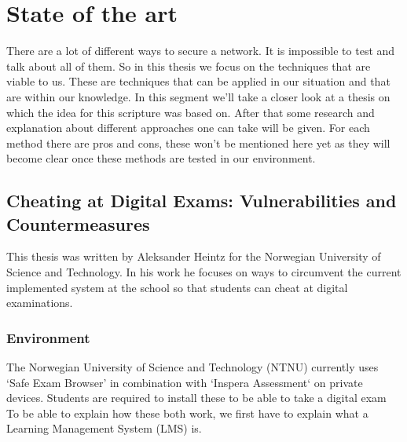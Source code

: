 \chapter{State of the art}
\label{ch:stand-van-zaken}



There are a lot of different ways to secure a network. It is impossible to test and talk about all of them. So in this thesis we focus on the techniques that are viable to us. These are techniques that can be applied in our situation and that are within our knowledge. In this segment we'll take a closer look at a thesis on which the idea for this scripture was based on. After that some research and explanation about different approaches one can take will be given. For each method there are pros and cons, these won't be mentioned here yet as they will become clear once these methods are tested in our environment.
\section{Cheating at Digital Exams: Vulnerabilities and Countermeasures}
This thesis was written by Aleksander Heintz for the Norwegian University of Science and Technology\textcite{thesis}. In his work he focuses on ways to circumvent the current implemented system at the school so that students can cheat at digital examinations.
\subsection{Environment}
The Norwegian University of Science and Technology (NTNU) currently uses `Safe Exam Browser' in combination with `Inspera Assessment` on private devices. Students are required to install these to be able to take a digital exam
To be able to explain how these both work, we first have to explain what a Learning Management System (LMS) is.
